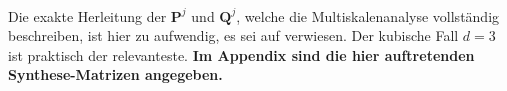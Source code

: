 \documentclass{article}
\begin{document}
\\
Die exakte Herleitung der $\mathbf{P}^j$ und $\mathbf{Q}^j$, welche die Multiskalenanalyse vollständig beschreiben, ist hier zu aufwendig, es sei auf \cite{finkelstein94} verwiesen. Der kubische Fall $d=3$ ist praktisch der relevanteste. \textbf{Im Appendix sind die hier auftretenden Synthese-Matrizen angegeben.}
%
%
\end{document}
